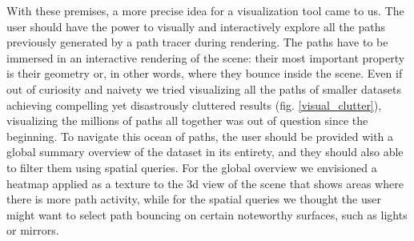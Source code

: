 With these premises, a more precise idea for a visualization tool came to us. 
The user should have the power to visually and interactively explore all the paths previously generated by a path tracer during rendering. The paths have to be immersed in an interactive rendering of the scene: their most important property is their geometry or, in other words, where they bounce inside the scene. Even if out of curiosity and naivety we tried visualizing all the paths of smaller datasets achieving compelling yet disastrously cluttered results (fig. \ref{visual_clutter}), visualizing the millions of paths all together was out of question since the beginning. To navigate this ocean of paths, the user should be provided with a global summary overview of the dataset in its entirety, and they should also able to filter them using spatial queries. For the global overview we envisioned a heatmap applied as a texture to the 3d view of the scene that shows areas where there is more path activity, while for the spatial queries we thought the user might want to select path bouncing on certain noteworthy surfaces, such as lights or mirrors. 

